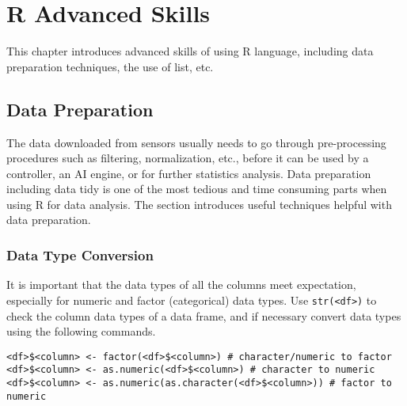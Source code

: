 \chapter{R Advanced Skills} \label{ch:r2}

This chapter introduces advanced skills of using R language, including data preparation techniques, the use of list, etc. 

\section{Data Preparation} \label{ch:r2:sec:datapreparation}

The data downloaded from sensors usually needs to go through pre-processing procedures such as filtering, normalization, etc., before it can be used by a controller, an AI engine, or for further statistics analysis. Data preparation including data tidy is one of the most tedious and time consuming parts when using R for data analysis. The section introduces useful techniques helpful with data preparation.

\subsection{Data Type Conversion}

It is important that the data types of all the columns meet expectation, especially for numeric and factor (categorical) data types. Use \verb|str(<df>)| to check the column data types of a data frame, and if necessary convert data types using the following commands.
\begin{lstlisting}
<df>$<column> <- factor(<df>$<column>) # character/numeric to factor
<df>$<column> <- as.numeric(<df>$<column>) # character to numeric
<df>$<column> <- as.numeric(as.character(<df>$<column>)) # factor to numeric
\end{lstlisting}

